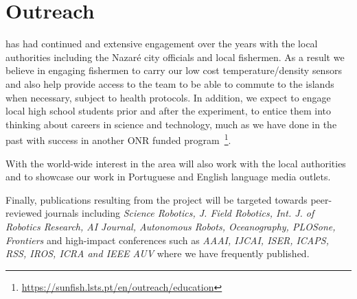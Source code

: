 \section*{Outreach}

\inst has had continued and extensive engagement over the years with
the local authorities including the Nazar\'e city officials and local
fishermen. As a result we believe in engaging fishermen to carry our
low cost temperature/density sensors and also help provide access to
the team to be able to commute to the islands when necessary, subject
to health protocols. In addition, we expect to engage local high
school students prior and after the experiment, to entice them into
thinking about careers in science and technology, much as we have done
in the past with success in another ONR funded
program~\footnote{\url{https://sunfish.lsts.pt/en/outreach/education}}.

With the world-wide interest in the area \proj will also work with the
local authorities and \inst to showcase our work in Portuguese and
English language media outlets.

Finally, publications resulting from the project will be targeted
towards peer-reviewed journals including \emph{Science Robotics,
  J. Field Robotics, Int. J. of Robotics Research, AI Journal,
  Autonomous Robots, Oceanography, PLOSone, Frontiers} and high-impact
conferences such as \emph{AAAI, IJCAI, ISER, ICAPS, RSS, IROS, ICRA
  and IEEE AUV} where we have frequently published.

